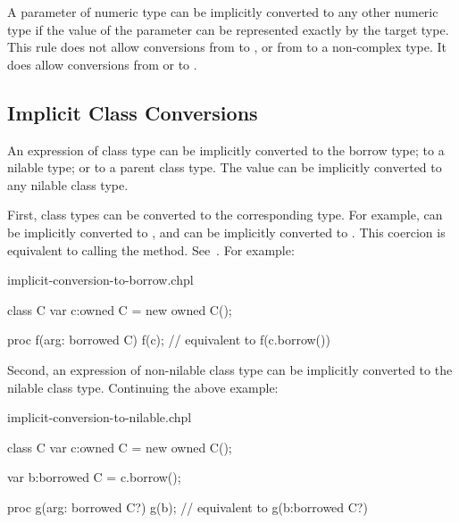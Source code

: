 A parameter of numeric type can be implicitly converted to any other
numeric type if the value of the parameter can be represented exactly by
the target type. This rule does not allow conversions from  to
, or from  to a non-complex type. It does allow
conversions from  or  to .

\subsection{Implicit Class Conversions}
\label{Implicit_Class_Conversions}

An expression of class type can be implicitly converted to the borrow type;
to a nilable type; or to a parent class type. The value  can be
implicitly converted to any nilable class type.

First, class types can be converted to the corresponding 
type. For example,  can be implicitly converted to
, and  can be implicitly converted to
. This coercion is equivalent to calling the
 method.  See~. For
example:

\begin{chapelexample}{implicit-conversion-to-borrow.chpl}
\begin{chapel}
class C { }
var c:owned C = new owned C();

proc f(arg: borrowed C) { }
f(c); // equivalent to f(c.borrow())
\end{chapel}
\begin{chapeloutput}
\end{chapeloutput}
\end{chapelexample}

Second, an expression of non-nilable class type can be implicitly
converted to the nilable class type. Continuing the above
example:

\begin{chapelexample}{implicit-conversion-to-nilable.chpl}
\begin{chapelpre}
class C { }
var c:owned C = new owned C();
\end{chapelpre}
\begin{chapel}
var b:borrowed C = c.borrow();

proc g(arg: borrowed C?) { }
g(b); // equivalent to g(b:borrowed C?)
\end{chapel}
\begin{chapeloutput}
\end{chapeloutput}
\end{chapelexample}

